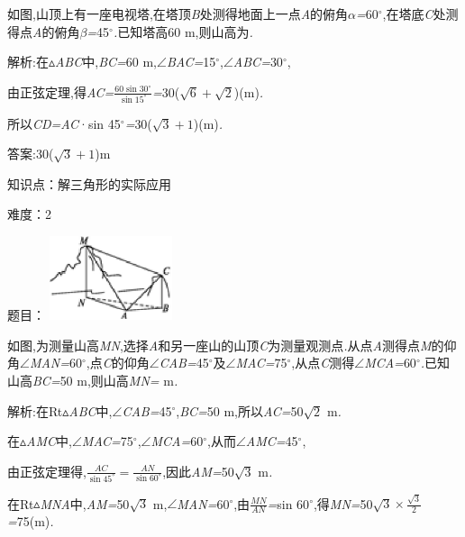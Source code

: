 \documentclass{article} %
\begin{document}
 如图,山顶上有一座电视塔,在塔顶\textit{B}处测得地面上一点\textit{A}的俯角\textit{$\alpha$=}60$\mathrm{{}^\circ}$,在塔底\textit{C}处测得点\textit{A}的俯角\textit{$\beta$=}45$\mathrm{{}^\circ}$\textit{.}已知塔高60 m,则山高为\textit{\underbar{　　　　　}.~}

 解析:在$\mathrm{\vartriangle}$\textit{ABC}中,\textit{BC=}60 m,$\mathrm{\angle}$\textit{BAC=}15$\mathrm{{}^\circ}$,$\mathrm{\angle}$\textit{ABC=}30$\mathrm{{}^\circ}$,

由正弦定理,得\textit{AC=}$\frac{60\sin 30^{\circ}}{\sin 15^{\circ}}$\textit{=}30($\sqrt{6}+\sqrt{2}$)(m)\textit{.}

所以\textit{CD=AC}·sin 45$\mathrm{{}^\circ}$\textit{=}30($\sqrt{3}+1$)(m)\textit{.}

 答案:30($\sqrt{3}+1$)m

知识点：解三角形的实际应用

难度：2

题目：
\includegraphics*[width=1.42in, height=0.97in, keepaspectratio=false]{image1117}

 如图,为测量山高\textit{MN},选择\textit{A}和另一座山的山顶\textit{C}为测量观测点\textit{.}从点\textit{A}测得点\textit{M}的仰角$\mathrm{\angle}$\textit{MAN=}60$\mathrm{{}^\circ}$,点\textit{C}的仰角$\mathrm{\angle}$\textit{CAB=}45$\mathrm{{}^\circ}$及$\mathrm{\angle}$\textit{MAC=}75$\mathrm{{}^\circ}$,从点\textit{C}测得$\mathrm{\angle}$\textit{MCA=}60$\mathrm{{}^\circ}$\textit{.}已知山高\textit{BC=}50 m,则山高\textit{MN=\underbar{　　　　　}} m\textit{.~}

 解析:在Rt$\mathrm{\vartriangle}$\textit{ABC}中,$\mathrm{\angle}$\textit{CAB=}45$\mathrm{{}^\circ}$,\textit{BC=}50 m,所以\textit{AC=}50$\sqrt{2}$ m\textit{.}

在$\mathrm{\vartriangle}$\textit{AMC}中,$\mathrm{\angle}$\textit{MAC=}75$\mathrm{{}^\circ}$,$\mathrm{\angle}$\textit{MCA=}60$\mathrm{{}^\circ}$,从而$\mathrm{\angle}$\textit{AMC=}45$\mathrm{{}^\circ}$,

由正弦定理得,$\frac{AC}{\sin45^{\circ}}=\frac{AN}{\sin 60^{\circ}}$,因此\textit{AM=}50$\sqrt{3}$ m\textit{.}

在Rt$\mathrm{\vartriangle}$\textit{MNA}中,\textit{AM=}50$\sqrt{3}$ m,$\mathrm{\angle}$\textit{MAN=}60$\mathrm{{}^\circ}$,由$\frac{MN}{AN}$\textit{=}sin 60$\mathrm{{}^\circ}$,得\textit{MN=}50$\sqrt{3}\times\frac{\sqrt{3}}{2}$\textit{=}75(m)\textit{.}
\end{document}

